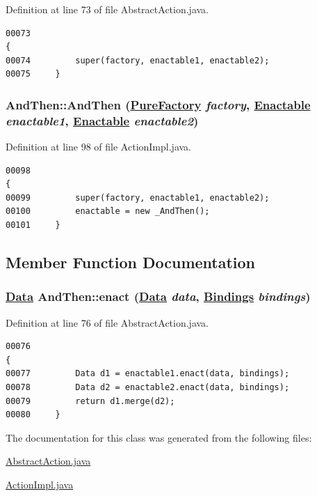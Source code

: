 Definition at line 73 of file Abstract\-Action.java.\footnotesize\begin{verbatim}00073                                                                                     {
00074         super(factory, enactable1, enactable2);
00075     }
\end{verbatim}\normalsize 
\hypertarget{classAndThen_a2}{
\subsubsection[AndThen]{\setlength{\rightskip}{0pt plus 5cm}And\-Then::And\-Then (\hyperlink{classPureFactory}{Pure\-Factory} {\em factory}, \hyperlink{interfaceEnactable}{Enactable} {\em enactable1}, \hyperlink{interfaceEnactable}{Enactable} {\em enactable2})}}
\label{classAndThen_a2}




Definition at line 98 of file Action\-Impl.java.\footnotesize\begin{verbatim}00098                                                                                     {
00099         super(factory, enactable1, enactable2);
00100         enactable = new _AndThen();
00101     }
\end{verbatim}\normalsize 


\subsection{Member Function Documentation}
\hypertarget{classAndThen_a1}{
\subsubsection[enact]{\setlength{\rightskip}{0pt plus 5cm}\hyperlink{interfaceData}{Data} And\-Then::enact (\hyperlink{interfaceData}{Data} {\em data}, \hyperlink{interfaceBindings}{Bindings} {\em bindings})}}
\label{classAndThen_a1}




Definition at line 76 of file Abstract\-Action.java.\footnotesize\begin{verbatim}00076                                                                                {
00077         Data d1 = enactable1.enact(data, bindings);
00078         Data d2 = enactable2.enact(data, bindings);
00079         return d1.merge(d2);
00080     }
\end{verbatim}\normalsize 


The documentation for this class was generated from the following files:\begin{CompactItemize}
\item 
\hyperlink{AbstractAction_8java-source}{Abstract\-Action.java}\item 
\hyperlink{ActionImpl_8java-source}{Action\-Impl.java}\end{CompactItemize}
